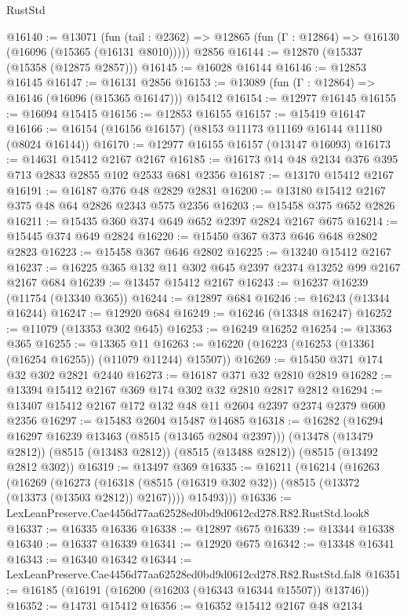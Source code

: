 \begin{lexlean}{RustStd}
\begin{coremodule}
@16140 := @13071
    (fun (tail : @2362) => @12865 (fun (Γ : @12864) => @16130 (@16096 (@15365 (@16131 @8010)))))
    @2856
@16144 := @12870 (@15337 (@15358 (@12875 @2857)))
@16145 := @16028 @16144
@16146 := @12853 @16145
@16147 := @16131 @2856
@16153 := @13089 (fun (Γ : @12864) => @16146 (@16096 (@15365 @16147))) @15412
@16154 := @12977 @16145
@16155 := @16094 @15415
@16156 := @12853 @16155
@16157 := @15419 @16147
@16166 := @16154 (@16156 @16157) (@8153 @11173 @11169 @16144 @11180 (@8024 @16144))
@16170 := @12977 @16155 @16157 (@13147 @16093)
@16173 := @14631 @15412 @2167 @2167
@16185 := @16173 @14 @48 @2134 @376 @395 @713 @2833 @2855 @102 @2533 @681 @2356
@16187 := @13170 @15412 @2167
@16191 := @16187 @376 @48 @2829 @2831
@16200 := @13180 @15412 @2167 @375 @48 @64 @2826 @2343 @575 @2356
@16203 := @15458 @375 @652 @2826
@16211 := @15435 @360 @374 @649 @652 @2397 @2824 @2167 @675
@16214 := @15445 @374 @649 @2824
@16220 := @15450 @367 @373 @646 @648 @2802 @2823
@16223 := @15458 @367 @646 @2802
@16225 := @13240 @15412 @2167
@16237 := @16225 @365 @132 @11 @302 @645 @2397 @2374 @13252 @99 @2167 @2167 @684
@16239 := @13457 @15412 @2167
@16243 := @16237 @16239 (@11754 (@13340 @365))
@16244 := @12897 @684
@16246 := @16243 (@13344 @16244)
@16247 := @12920 @684
@16249 := @16246 (@13348 @16247)
@16252 := @11079 (@13353 @302 @645)
@16253 := @16249 @16252
@16254 := @13363 @365
@16255 := @13365 @11
@16263 := @16220 (@16223 (@16253 (@13361 (@16254 @16255)) (@11079 @11244) @15507))
@16269 := @15450 @371 @174 @32 @302 @2821 @2440
@16273 := @16187 @371 @32 @2810 @2819
@16282 := @13394 @15412 @2167 @369 @174 @302 @32 @2810 @2817 @2812
@16294 := @13407 @15412 @2167 @172 @132 @48 @11 @2604 @2397 @2374 @2379 @600 @2356
@16297 := @15483 @2604 @15487 @14685
@16318 := @16282
    (@16294 @16297 @16239 @13463 (@8515 (@13465 @2804 @2397)))
    (@13478 (@13479 @2812))
    (@8515 (@13483 @2812))
    (@8515 (@13488 @2812))
    (@8515 (@13492 @2812 @302))
@16319 := @13497 @369
@16335 := @16211
    (@16214
      (@16263
        (@16269
          (@16273 (@16318 (@8515 (@16319 @302 @32)) (@8515 (@13372 (@13373 (@13503 @2812)) @2167))))
          @15493)))
@16336 := LexLeanPreserve.Cae4456d77aa62528ed0bd9d0612cd278.R82.RustStd.look8
@16337 := @16335 @16336
@16338 := @12897 @675
@16339 := @13344 @16338
@16340 := @16337 @16339
@16341 := @12920 @675
@16342 := @13348 @16341
@16343 := @16340 @16342
@16344 := LexLeanPreserve.Cae4456d77aa62528ed0bd9d0612cd278.R82.RustStd.fal8
@16351 := @16185 (@16191 (@16200 (@16203 (@16343 @16344 @15507)) @13746))
@16352 := @14731 @15412
@16356 := @16352 @15412 @2167 @48 @2134

\end{coremodule}
\end{lexlean}
